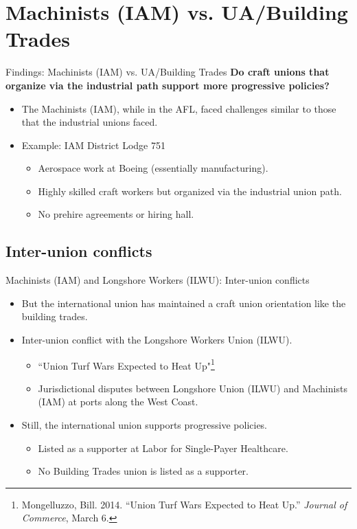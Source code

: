 \documentclass{beamer}
\begin{document}
\section{Machinists (IAM) vs. UA/Building Trades}
\begin{frame}{Findings: Machinists (IAM) vs. UA/Building Trades}
\textbf{Do craft unions that organize via the industrial path support more progressive policies?}\newline
	\begin{itemize}
		\item The Machinists (IAM), while in the AFL, faced challenges similar to those that the industrial unions faced.
		\item Example: IAM District Lodge 751
		\begin{itemize}
			\item Aerospace work at Boeing (essentially manufacturing).
			\item Highly skilled craft workers but organized via the industrial union path.
			\item No prehire agreements or hiring hall.
		\end{itemize}
	\end{itemize}
\end{frame}



\subsection{Inter-union conflicts}
\begin{frame}{Machinists (IAM) and Longshore Workers (ILWU): Inter-union conflicts}
	\begin{itemize}
		\item But the international union has maintained a craft union orientation like the building trades.
		\item Inter-union conflict with the Longshore Workers Union (ILWU).
		\begin{itemize}
			\item ``Union Turf Wars Expected to Heat Up"\footnote{\tiny Mongelluzzo, Bill. 2014. “Union Turf Wars Expected to Heat Up.” \textit{Journal of Commerce}, March 6.}
			\item Jurisdictional disputes between Longshore Union (ILWU) and Machinists (IAM) at ports along the West Coast.
		\end{itemize}
	\item Still, the international union supports progressive policies.
		\begin{itemize}
			\item Listed as a supporter at Labor for Single-Payer Healthcare.
			\item No Building Trades union is listed as a supporter.
		\end{itemize}
	\end{itemize}
\end{frame}
	
\end{document}
